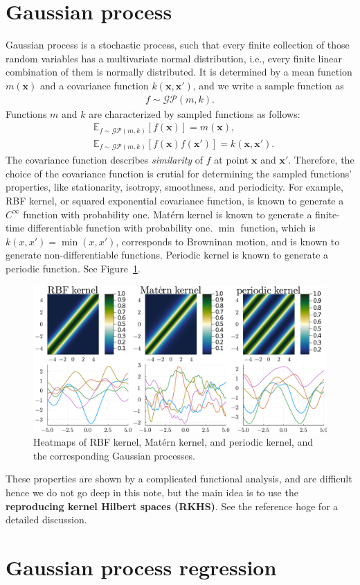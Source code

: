 \section{Gaussian process}
Gaussian process is a stochastic process, such that every finite collection of those random variables has a multivariate normal distribution, i.e., every finite linear combination of them is normally distributed.
It is determined by a mean function $m(\bm{x})$ and a covariance function $k(\bm{x},\bm{x}')$,
and we write a sample function as
\begin{align}
    f\sim\mathcal{GP}(m,k).
\end{align}
Functions $m$ and $k$ are characterized by sampled functions as follows:
\begin{align}
    &\mathbb{E}_{f\sim\mathcal{GP}(m,k)}\left[f(\bm{x})\right]=m(\bm{x}),\\
    &\mathbb{E}_{f\sim\mathcal{GP}(m,k)}\left[f(\bm{x})f(\bm{x}')\right]=k(\bm{x},\bm{x}').
\end{align}
The covariance function describes \textit{similarity} of $f$ at point $\bm{x}$ and $\bm{x}'$.
Therefore, the choice of the covariance function is crutial for determining the sampled functions' properties, like stationarity, isotropy, smoothness, and periodicity.
For example, RBF kernel, or squared exponential covariance function, is known to generate a $C^{\infty}$ function with probability one.
Mat\'ern kernel is known to generate a finite-time differentiable function with probability one.
$\min$ function, which is $k(x,x')=\min(x,x')$, corresponds to Browninan motion, and is known to generate non-differentiable functions.
Periodic kernel is known to generate a periodic function.
See Figure~\ref{fig:kernelgp}.

\begin{figure}[htbp]
    \centering
    \includegraphics[width=\textwidth]{figs/kernelgp.pdf}
    \caption{Heatmaps of RBF kernel, Mat\'ern kernel, and periodic kernel, and the corresponding Gaussian processes.}
    \label{fig:kernelgp}
\end{figure}

These properties are shown by a complicated functional analysis, and are difficult hence we do not go deep in this note,
but the main idea is to use the \textbf{reproducing kernel Hilbert spaces (RKHS)}.
See the reference hoge for a detailed discussion.

\section{Gaussian process regression}